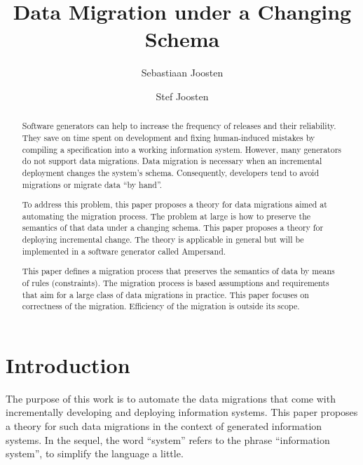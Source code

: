 \documentclass[runningheads]{llncs}
\begin{document}
%

\title{Data Migration under a Changing Schema}
%
%
\author{Sebastiaan Joosten\\ \and
Stef Joosten}
%
%
%
\maketitle              %
%
\begin{abstract}  %
Software generators can help to increase the frequency of releases and their reliability.
They save on time spent on development and fixing human-induced mistakes by compiling a specification into a working information system.
However, many generators do not support data migrations.
Data migration is necessary when an incremental deployment changes the system's schema.
Consequently, developers tend to avoid migrations or migrate data ``by hand''.

To address this problem, this paper proposes a theory for data migrations aimed at automating the migration process.
The problem at large is how to preserve the semantics of that data under a changing schema.
This paper proposes a theory for deploying incremental change.
The theory is applicable in general but will be implemented in a software generator called Ampersand.

This paper defines a migration process that preserves the semantics of data by means of rules (constraints).
The migration process is based assumptions and requirements that aim for a large class of data migrations in practice.
This paper focuses on correctness of the migration. Efficiency of the migration is outside its scope.

\end{abstract}
%
%
%
\section{Introduction}
\label{sct:Introduction}
   The purpose of this work is to automate the data migrations that come with incrementally developing and deploying information systems.
   This paper proposes a theory for such data migrations in the context of generated information systems.
   In the sequel, the word ``system'' refers to the phrase ``information system'', to simplify the language a little.
\end{document}
